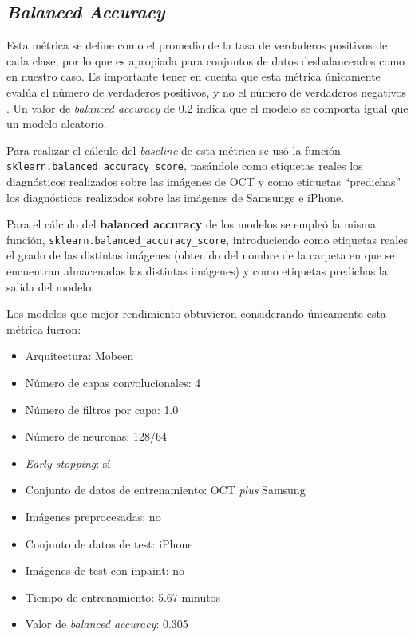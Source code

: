 \subsection{\textit{Balanced Accuracy}}

Esta métrica se define como el promedio de la tasa de verdaderos positivos de cada clase, por lo que es apropiada para conjuntos de datos desbalanceados como en nuestro caso. Es importante tener en cuenta que esta métrica únicamente evalúa el número de verdaderos positivos, y no el número de verdaderos negativos \cite{sklearn:balacc}. Un valor de \textit{balanced accuracy} de 0.2 indica que el modelo se comporta igual que un modelo aleatorio.

Para realizar el cálculo del \textit{baseline} de esta métrica se usó la función \texttt{sklearn.balanced\_accuracy\_score}, pasándole como etiquetas reales los diagnósticos realizados sobre las imágenes de OCT y como etiquetas ``predichas'' los diagnósticos realizados sobre las imágenes de Samsunge e iPhone.

Para el cálculo del \textbf{balanced accuracy} de los modelos se empleó la misma función, \texttt{sklearn.balanced\_accuracy\_score}, introduciendo como etiquetas reales el grado de las distintas imágenes (obtenido del nombre de la carpeta en que se encuentran almacenadas las distintas imágenes) y como etiquetas predichas la salida del modelo.

Los modelos que mejor rendimiento obtuvieron considerando únicamente esta métrica fueron:

\begin{itemize}
    \item Arquitectura: Mobeen
    \item Número de capas convolucionales: 4
    \item Número de filtros por capa: 1.0
    \item Número de neuronas: 128/64
    \item \textit{Early stopping}: sí
    \item Conjunto de datos de entrenamiento: OCT \textit{plus} Samsung
    \item Imágenes preprocesadas: no
    \item Conjunto de datos de test: iPhone
    \item Imágenes de test con inpaint: no
    \item Tiempo de entrenamiento: 5.67 minutos
    \item Valor de \textit{balanced accuracy}: 0.305
\end{itemize}

